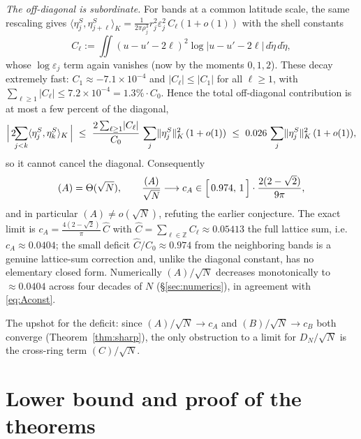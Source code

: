 \documentclass[11pt,reqno]{amsart}
\theoremstyle{definition}
\newcommand{\Z}{\mathbb{Z}}
\newcommand{\inner}[2]{\langle #1,#2\rangle}
\newcommand{\eps}{\varepsilon}
\newcommand{\abs}[1]{\lvert #1\rvert}
\newcommand{\Def}{D_N}
\newcommand{\rp}{\rho}
\begin{document}
\emph{The off-diagonal is subordinate.} For bands at a common latitude scale, the same rescaling gives
$\inner{\eta_j^S}{\eta_{j+\ell}^S}_K=\frac{1}{2\pi\rp_j^3}r_j^2\eps_j^2\,C_\ell(1+o(1))$ with the shell
constants
\begin{equation}\label{eq:shell}
   C_\ell:=\iint(u-u'-2\ell)^2\log\abs{u-u'-2\ell}\,d\tilde\eta\,d\tilde\eta ,
\end{equation}
whose $\log\eps_j$ term again vanishes (now by the moments $0,1,2$). These decay extremely fast:
$C_1\approx-7.1\times10^{-4}$ and $\abs{C_\ell}\le\abs{C_1}$ for all $\ell\ge1$, with
$\sum_{\ell\ge1}\abs{C_\ell}\le 7.2\times10^{-4}=1.3\%\cdot C_0$. Hence the total off-diagonal
contribution is at most a few percent of the diagonal,
\[
   \Bigl\lvert\,2\!\!\sum_{j<k}\inner{\eta_j^S}{\eta_k^S}_K\,\Bigr\rvert
   \ \le\ \frac{2\sum_{\ell\ge1}\abs{C_\ell}}{C_0}\,\sum_j\lVert\eta_j^S\rVert_K^2\,(1+o(1))
   \ \le\ 0.026\,\sum_j\lVert\eta_j^S\rVert_K^2\,(1+o(1)),
\]
so it cannot cancel the diagonal. Consequently
\begin{equation}\label{eq:Aconst}
   (A)=\Theta(\sqrt N),\qquad \frac{(A)}{\sqrt N}\longrightarrow c_A\in\Bigl[\,0.974,\,1\,\Bigr]\cdot
   \frac{2(2-\sqrt2)}{9\pi},
\end{equation}
and in particular \textbf{$(A)\ne o(\sqrt N)$}, refuting the earlier conjecture. The exact limit is
$c_A=\frac{4(2-\sqrt2)}{\pi}\,\widehat C$ with $\widehat C=\sum_{\ell\in\Z}C_\ell\approx0.05413$ the full lattice
sum, i.e.\ $c_A\approx0.0404$; the small deficit $\widehat C/C_0\approx0.974$ from the neighboring bands is
a genuine lattice-sum correction and, unlike the diagonal constant, has no elementary closed form.
Numerically $(A)/\sqrt N$ decreases monotonically to $\approx0.0404$ across four decades of $N$
(\S\ref{sec:numerics}), in agreement with \eqref{eq:Aconst}.

The upshot for the deficit: since $(A)/\sqrt N\to c_A$ and $(B)/\sqrt N\to c_B$ both converge
(Theorem~\ref{thm:sharp}), the only obstruction to a limit for $\Def/\sqrt N$ is the cross-ring term
$(C)/\sqrt N$.


\section{Lower bound and proof of the theorems}\label{sec:lower}
\end{document}
